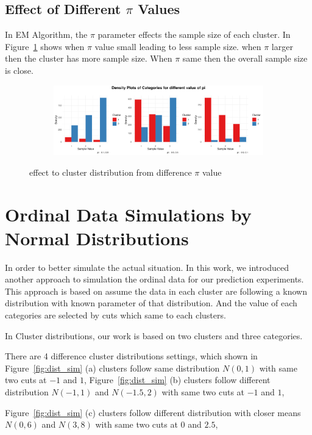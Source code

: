 \documentclass{article}
\begin{document}
\subsection{Effect of Different $\pi$ Values}
In EM Algorithm, the $\pi$ parameter effects the sample size of each cluster. 
In Figure~\ref{fig:pi} shows when $\pi$ value small leading to less sample size.
when $\pi$ larger then the cluster has more sample size.
When $\pi$ same then the overall sample size is close.
\begin{figure}[htbp!]
  \centering
  \begin{subfigure}{1.0\textwidth}
      \centering
      \includegraphics[width=\textwidth]{images/para_sim/pi.png}
  \end{subfigure}
  \caption{effect to cluster distribution from difference $\pi$ value}
  \label{fig:pi}
\end{figure}

\section{Ordinal Data Simulations by Normal Distributions}

In order to better simulate the actual situation.
In this work, we introduced another approach to simulation the ordinal data 
for our prediction experiments. 
This approach is based on assume the data in each cluster are following 
a known distribution with known parameter of that distribution.
And the value of each categories are selected by cuts which same to each clusters.

In Cluster distributions, our work is based on two clusters and three categories.

There are 4 difference cluster distributions settings, which shown in 
Figure~\ref*{fig:dist_sim} (a) clusters follow same distribution $N(0, 1)$ 
with same two cuts at $-1$ and $1$,
Figure~\ref*{fig:dist_sim} (b) clusters follow different distribution $N(-1,1)$ and $N(-1.5,2)$
with same two cuts at $-1$ and $1$,

Figure~\ref*{fig:dist_sim} (c) clusters follow different distribution with closer means $N(0,6)$ and $N(3,8)$
with same two cuts at $0$ and $2.5$,
\end{document}
